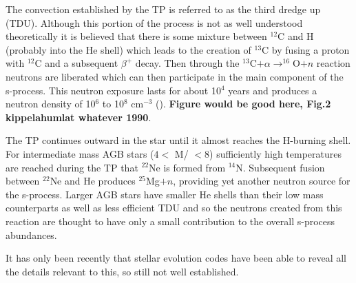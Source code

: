 The convection established by the TP is referred to as the third
dredge up (TDU).  Although this portion of the process is not as well
understood theoretically it is believed that there is some mixture
between $^{12}$C
and H (probably into the He shell) which leads to the creation of
$^{13}$C by fusing a proton 
with $^{12}$C and a subsequent $\beta^+$ decay.  Then through the
$^{13}$C$+ \alpha \rightarrow ^{16}$O$+n$ reaction neutrons are
liberated which can then participate in the main component of the
s-process.  This neutron exposure lasts for about 10$^4$ years and
produces a neutron density of 10$^6$ to 10$^8$ cm$^{-3}$
(\citealt{kappeleretal2011}).  {\bf Figure would be good here, Fig.2
kippelahumlat whatever 1990}.

The TP continues outward in the star until it almost reaches the
H-burning shell.  For intermediate mass  AGB stars ($4<$ M/\Msol
$< 8$) sufficiently high temperatures are reached during the TP that 
 $^{22}$Ne is formed from $^{14}$N.  Subsequent fusion
between $^{22}$Ne and He produces $^{25}$Mg$+n$, providing yet another
neutron source for the s-process.  Larger AGB stars have smaller He
shells than their low mass counterparts as well as less efficient TDU
and so the neutrons created from this reaction are thought to have
only a small contribution to the overall s-process abundances.



It has only been recently that stellar evolution codes have been able
to reveal all the details relevant to this, so still not well established.
